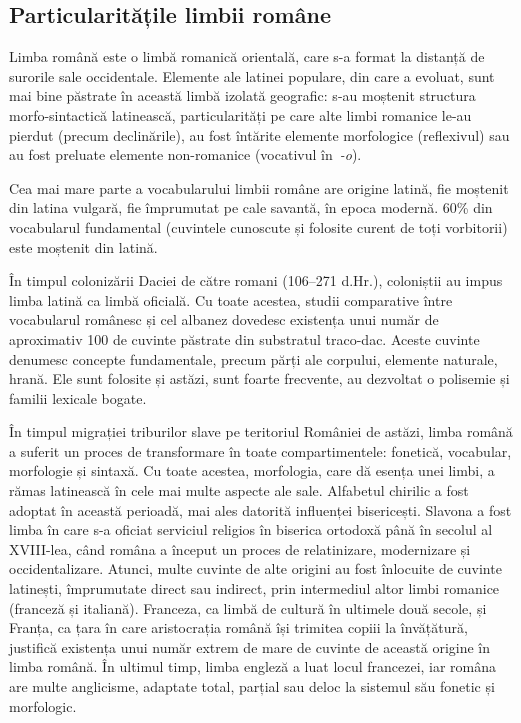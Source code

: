 \begin{multicols}{2}
\subsection{Particularitățile limbii române}
Limba română este o limbă romanică orientală, care s-a format la distanță de surorile sale occidentale. Elemente ale latinei populare, din care a evoluat, sunt mai bine păstrate în această limbă izolată geografic: s-au moștenit structura morfo-sintactică latinească, particularități pe care alte limbi romanice le-au pierdut (precum declinările), au fost întărite elemente morfologice (reflexivul) sau au fost preluate elemente non-romanice (vocativul în~\textit{-o}).

Cea mai mare parte a vocabularului limbii române are origine latină, fie moștenit din latina vulgară, fie împrumutat pe cale savantă, în epoca modernă. 60\% din vocabularul fundamental (cuvintele cunoscute și folosite curent de toți vorbitorii) este moștenit din latină.

În timpul colonizării Daciei de către romani (106--271 d.Hr.), coloniștii au impus limba latină ca limbă oficială. Cu toate acestea, studii comparative între vocabularul românesc și cel albanez dovedesc existența unui număr de aproximativ 100 de cuvinte păstrate din substratul traco-dac. Aceste cuvinte denumesc concepte fundamentale, precum părți ale corpului, elemente naturale, hrană. Ele sunt folosite și astăzi, sunt foarte frecvente, au dezvoltat o polisemie și familii lexicale bogate.

În timpul migrației triburilor slave pe teritoriul României de astăzi, limba română a suferit un proces de transformare în toate compartimentele: fonetică, vocabular, morfologie și sintaxă. Cu toate acestea, morfologia, care dă esența unei limbi, a rămas latinească în cele mai multe aspecte ale sale. Alfabetul chirilic a fost adoptat în această perioadă, mai ales datorită influenței bisericești. Slavona a fost limba în care \mbox{s-a} oficiat serviciul religios în biserica ortodoxă până în secolul al \mbox{XVIII-lea}, când româna a început un proces de relatinizare, modernizare și occidentalizare. Atunci, multe cuvinte de alte origini au fost înlocuite de cuvinte latinești, împrumutate direct sau indirect, prin intermediul altor limbi romanice (franceză și italiană). Franceza, ca limbă de cultură în ultimele două secole, și Franța, ca țara în care aristocrația română își trimitea copiii la învățătură, justifică existența unui număr extrem de mare de cuvinte de această origine în limba română. În ultimul timp, limba engleză a luat locul francezei, iar româna are multe anglicisme, adaptate total, parțial sau deloc la sistemul său fonetic și morfologic. 


\end{multicols}
